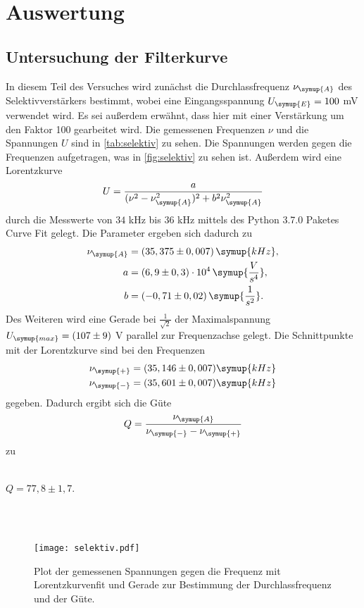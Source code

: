 \section{Auswertung}
\label{sec:Auswertung}
    \subsection{Untersuchung der Filterkurve}
    In diesem Teil des Versuches wird zunächst die Durchlassfrequenz $\nu_{\symup{A}}$ des Selektivverstärkers bestimmt, wobei eine
    Eingangsspannung $U_{\symup{E}} = 100$ mV verwendet wird. Es sei außerdem erwähnt, dass hier mit einer Verstärkung um den Faktor 100
    gearbeitet wird. Die gemessenen Frequenzen $\nu$ und die Spannungen $U$ sind in \autoref{tab:selektiv} zu sehen. 
    Die Spannungen werden gegen die Frequenzen aufgetragen, was in \autoref{fig:selektiv} zu sehen ist. Außerdem wird eine Lorentzkurve
    \begin{equation}
    \label{eqn:lorentz}
        U = \frac{a}{(\nu^2 - \nu_{\symup{A}}^2)^2 + b^2 \nu_{\symup{A}}^2}
    \end{equation}
    durch die Messwerte von $34$ kHz bis $36$ kHz mittels des Python 3.7.0 Paketes Curve Fit gelegt. Die Parameter ergeben sich dadurch zu 
    \begin{align*}
    \nu_{\symup{A}} &= (35,375 \pm 0,007) \, \symup{kHz}, \\
    a &= (6,9 \pm 0,3) \cdot 10^4 \, \symup{\frac{V}{s^4}}, \\
    b &= (- 0,71 \pm 0,02) \, \symup{\frac{1}{s^2}}.
    \end{align*}
    Des Weiteren wird eine Gerade bei $\frac{1}{\sqrt{2}}$ der Maximalspannung $U_{\symup{max}} = (107 \pm 9)$ V parallel zur Frequenzachse
    gelegt. Die Schnittpunkte mit der Lorentzkurve sind bei den Frequenzen
    \begin{align*}
    \nu_{\symup{+}} &= (35,146 \pm 0,007) \symup{kHz}\\
    \nu_{\symup{-}} &= (35,601 \pm 0,007) \symup{kHz}
    \end{align*} 
    gegeben. Dadurch ergibt sich die Güte
    \begin{equation}
    \label{eqn:guete}
        Q = \frac{\nu_{\symup{A}}}{\nu_{\symup{-}} - \nu_{\symup{+}}}
    \end{equation}
    zu 
    \\ \\
    \centerline{$Q = 77,8 \pm 1,7 $.}    
    \\ \\
     
    \begin{figure}
        \centering
        \texttt{[image: selektiv.pdf]}
        \caption{Plot der gemessenen Spannungen gegen die Frequenz mit Lorentzkurvenfit und Gerade zur Bestimmung der Durchlassfrequenz und der Güte.}
    \label{fig:selektiv}
    \end{figure}

